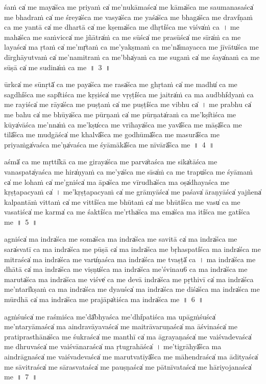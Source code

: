 \documentclass[parskip, DIV=14]{scrartcl}
\begin{document}
{śaṁ ca̍ me॒ maya̍śca me pri॒yaṁ ca̍ me’nukā॒maśca̍ me॒ kāma̍śca me saumana॒saśca̍ me bha॒draṁ ca̍ me॒ śreya̍śca me॒ vasya̍śca me॒ yaśa̍śca me॒ bhaga̍śca me॒ dravi̍ṇaṁ ca me ya॒ntā ca̍ me dha॒rtā ca̍ me॒ kṣema̍śca me॒ dhṛti̍śca me॒ viśva̍ṁ ca~। me॒ maha̍śca me sa॒ṁvicca̍ me॒ jñātra̍ṁ ca me॒ sūśca̍ me pra॒sūśca̍ me॒ sīra̍ṁ ca me la॒yaśca̍ ma ṛ॒taṁ ca̍ me॒’mṛ̍taṁ ca me’ya॒kṣmaṁ ca॒ me’nā̍mayacca me jī॒vātu̍śca me dīrghāyu॒tvaṁ ca̍ me’nami॒traṁ ca॒ me’bha̍yaṁ ca me su॒gaṁ ca̍ me॒ śaya̍naṁ ca me sū॒॒ṣā ca̍ me su॒dina̍ṁ ca me~॥~3~॥

ūrkca̍ me sū॒॒nṛtā̍ ca me॒ paya̍śca me॒ rasa̍śca me ghṛ॒taṁ ca̍ me॒ madhu̍ ca me॒ sagdhi̍śca me॒ sapī̍tiśca me kṛ॒ṣiśca̍ me॒ vṛṣṭi̍śca me॒ jaitra̍ṁ ca ma॒ audbhi̍dyaṁ ca me ra॒yiśca̍ me॒ rāya̍śca me pu॒ṣṭaṁ ca̍ me॒ puṣṭi̍śca me vi॒bhu ca̍~। me॒ pra॒bhu ca̍ me ba॒hu ca̍ me॒ bhūya̍śca me pū॒॒rṇaṁ ca̍ me pū॒॒rṇata̍raṁ ca॒ me’kṣi̍tiśca me॒ kūya̍vāśca॒ me’nna̍ṁ ca॒ me’kṣu̍cca me vrī॒haya̍śca me॒ yavā̎śca me॒ māṣā̎śca me॒ tilā̎śca me mu॒dgāśca̍ me kha॒lvā̎śca me go॒dhūmā̎śca me ma॒surā̎śca me pri॒yaṁga̍vaśca॒ me’ṇa̍vaśca me śyā॒mākā̎śca me nī॒vārā̎śca me~॥~4~॥

aśmā̍ ca me॒ mṛtti̍kā ca me gi॒raya̍śca me॒ parva̍taśca me॒ sika̍tāśca me॒ vana॒spata̍yaśca me॒ hira̍ṇyaṁ ca॒ me’ya̍śca me॒ sīsa̍ṁ ca me॒ trapu̍śca me śyā॒maṁ ca̍ me lo॒haṁ ca̍ me॒’gniśca̍ ma॒ āpa̍śca me vī॒rudha̍śca ma॒ oṣa̍dhayaśca me kṛṣṭapa॒cyaṁ ca̍~। me॒’kṛ॒ṣṭa॒pa॒cyaṁ ca̍ me grā॒myāśca̍ me pa॒śava̍ āra॒ṇyāśca̍ ya॒jñena̍ kalpantāṁ vi॒ttaṁ ca̍ me॒ vitti̍śca me bhū॒॒taṁ ca̍ me॒ bhūti̍śca me॒ vasu̍ ca me vasa॒tiśca̍ me॒ karma̍ ca me॒ śakti̍śca॒ me’rtha̍śca ma॒ ema̍śca ma॒ iti̍śca me॒ gati̍śca me~॥~5~॥

a॒gniśca̍ ma॒ indra̍śca me॒ soma̍śca ma॒ indra̍śca me savi॒tā ca̍ ma॒ indra̍śca me॒ sara̍svatī ca ma॒ indra̍śca me pū॒॒ṣā ca̍ ma॒ indra̍śca me॒ bṛha॒spati̍śca ma॒ indra̍śca me mi॒traśca̍ ma॒ indra̍śca me॒ varu̍ṇaśca ma॒ indra̍śca me॒ tvaṣṭā̍ ca~। ma॒ indra̍śca me dhā॒tā ca̍ ma॒ indra̍śca me॒ viṣṇu̍śca ma॒ indra̍śca me॒’śvinau6 ca ma॒ indra̍śca me ma॒ruta̍śca ma॒ indra̍śca me॒ viśve̍ ca me de॒vā indra̍śca me pṛthi॒vī ca̍ ma॒ indra̍śca me॒’ntari̍kṣaṁ ca ma॒ indra̍śca me॒ dyauśca̍ ma॒ indra̍śca me॒ diśa̍śca ma॒ indra̍śca me mū॒॒rdhā ca̍ ma॒ indra̍śca me pra॒jāpa̍tiśca ma॒ indra̍śca me~॥~6~॥

a॒gṁ॒śuśca̍ me ra॒śmiśca॒ me’dā̎bhyaśca॒ me’dhi̍patiśca ma upā॒gṁ॒śuśca̍ me’ntaryā॒maśca̍ ma aindravāya॒vaśca̍ me maitrāvaru॒ṇaśca̍ ma āśvi॒naśca̍ me pratipra॒sthāna̍śca me śu॒kraśca̍ me ma॒nthī ca̍ ma āgraya॒ṇaśca̍ me vaiśvade॒vaśca̍ me dhru॒vaśca̍ me vaiśvāna॒raśca̍ ma ṛtugra॒hāśca̍~। me॒’ti॒grā॒hyā̎śca ma aindrā॒gnaśca̍ me vaiśvade॒vaśca̍ me marutva॒tīyā̎śca me māhe॒ndraśca̍ ma॒ ādi॒tyaśca̍ me sāvi॒traśca̍ me sārasva॒taśca̍ me pau॒ṣṇaśca̍ me pātnīva॒taśca̍ me hāriyoja॒naśca̍ me~॥~7~॥

}
\end{document}
